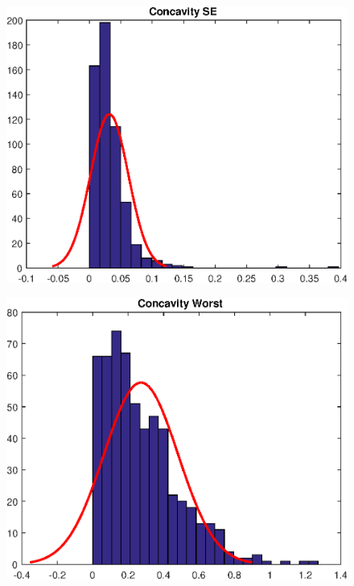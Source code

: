 \documentclass[11pt,a4paper]{article}
\numberwithin{equation}{section}
\begin{document}
\begin{itemize}
\begin{figure}[H]
\centering
\begin{minipage}{.4\textwidth}
  \centering
  \includegraphics[width=\linewidth]{./img/concavity_se}
  \label{fig:test1}
\end{minipage}%
\begin{minipage}{.4\textwidth}
  \centering
  \includegraphics[width=\linewidth]{./img/concavity_worst}
  \label{fig:test2}
\end{minipage}
\end{figure}


\end{itemize}
\end{document}
